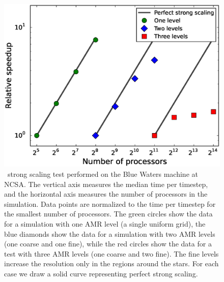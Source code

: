 \documentclass[12pt]{article}
\begin{document}
\begin{figure}
  \centering
  \includegraphics[scale=0.8]{plots/strong_scaling}
  \caption[\castro\ strong scaling test]
          {\castro\ strong scaling test performed on the Blue Waters machine at
           NCSA. The vertical axis measures the median time per timestep, and the 
           horizontal axis measures the number of processors in the simulation. Data 
           points are normalized to the time per timestep for the smallest number 
           of processors. The green circles show the data for a simulation with one 
           AMR level (a single uniform grid), the blue diamonds show the data for a simulation with two AMR
           levels (one coarse and one fine), while the red circles show the data 
           for a test with three AMR levels (one coarse and two fine). The fine levels 
           increase the resolution only in the regions around the stars. For each case 
           we draw a solid curve representing perfect strong scaling.
           \label{fig:strong_scaling}}
\end{figure}
\end{document}
